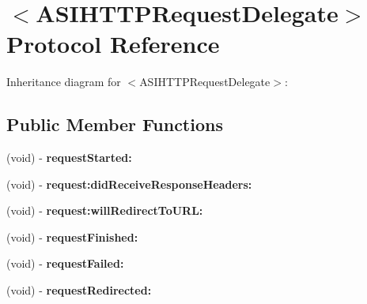 \hypertarget{protocol_a_s_i_h_t_t_p_request_delegate-p}{
\section{$<$\-A\-S\-I\-H\-T\-T\-P\-Request\-Delegate$>$ \-Protocol \-Reference}
\label{protocol_a_s_i_h_t_t_p_request_delegate-p}
}


\-Inheritance diagram for $<$\-A\-S\-I\-H\-T\-T\-P\-Request\-Delegate$>$\-:
\subsection*{\-Public \-Member \-Functions}
\begin{DoxyCompactItemize}
\item 
\hypertarget{protocol_a_s_i_h_t_t_p_request_delegate-p_a03a27f65813cc0518069040c51829cc7}{
(void) -\/ {\bfseries request\-Started\-:}}
\label{protocol_a_s_i_h_t_t_p_request_delegate-p_a03a27f65813cc0518069040c51829cc7}

\item 
\hypertarget{protocol_a_s_i_h_t_t_p_request_delegate-p_a5b3d0da29a026e346a4e20fbc4496d7a}{
(void) -\/ {\bfseries request\-:did\-Receive\-Response\-Headers\-:}}
\label{protocol_a_s_i_h_t_t_p_request_delegate-p_a5b3d0da29a026e346a4e20fbc4496d7a}

\item 
\hypertarget{protocol_a_s_i_h_t_t_p_request_delegate-p_afcf401ad6e4e0720294eeb397c91ceb2}{
(void) -\/ {\bfseries request\-:will\-Redirect\-To\-U\-R\-L\-:}}
\label{protocol_a_s_i_h_t_t_p_request_delegate-p_afcf401ad6e4e0720294eeb397c91ceb2}

\item 
\hypertarget{protocol_a_s_i_h_t_t_p_request_delegate-p_ae8c2e579bac071f453e4e9c049c89b14}{
(void) -\/ {\bfseries request\-Finished\-:}}
\label{protocol_a_s_i_h_t_t_p_request_delegate-p_ae8c2e579bac071f453e4e9c049c89b14}

\item 
\hypertarget{protocol_a_s_i_h_t_t_p_request_delegate-p_ab11585a1f1607c355d9254cfd632beb3}{
(void) -\/ {\bfseries request\-Failed\-:}}
\label{protocol_a_s_i_h_t_t_p_request_delegate-p_ab11585a1f1607c355d9254cfd632beb3}

\item 
\hypertarget{protocol_a_s_i_h_t_t_p_request_delegate-p_aa430abb67dd063b72e8171e614469ea1}{
(void) -\/ {\bfseries request\-Redirected\-:}}
\label{protocol_a_s_i_h_t_t_p_request_delegate-p_aa430abb67dd063b72e8171e614469ea1}


\end{DoxyCompactItemize}
